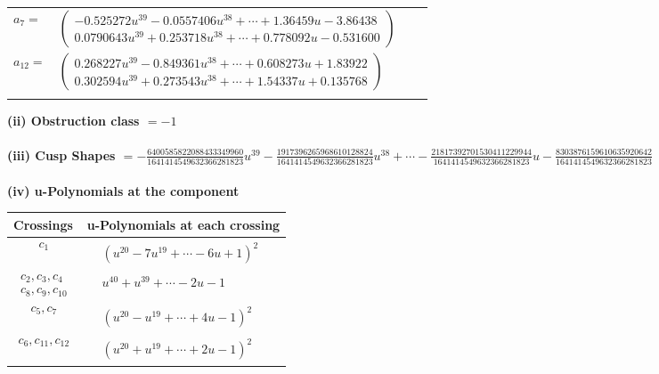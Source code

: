 \documentclass[1p]{elsarticle_modified}
\theoremstyle{definition}
\begin{document}
\begin{tabular}{m{7pt} m{180pt} m{7pt} m{180pt} }
\flushright $a_{7}=$&$\begin{pmatrix}-0.525272 u^{39}-0.0557406 u^{38}+\cdots+1.36459 u-3.86438\\0.0790643 u^{39}+0.253718 u^{38}+\cdots+0.778092 u-0.531600\end{pmatrix}$ \\
\flushright $a_{12}=$&$\begin{pmatrix}0.268227 u^{39}-0.849361 u^{38}+\cdots+0.608273 u+1.83922\\0.302594 u^{39}+0.273543 u^{38}+\cdots+1.54337 u+0.135768\end{pmatrix}$\\&\end{tabular}
\flushleft \textbf{(ii) Obstruction class $= -1$}\\~\\
\flushleft \textbf{(iii) Cusp Shapes $= -\frac{6400585822088433349960}{1641414549632366281823} u^{39}-\frac{1917396265968610128824}{1641414549632366281823} u^{38}+\cdots-\frac{21817392701530411229944}{1641414549632366281823} u-\frac{8303876159610635920642}{1641414549632366281823}$}\\~\\
\newpage\renewcommand{\arraystretch}{1}
\flushleft \textbf{(iv) u-Polynomials at the component}\newline \\
\begin{tabular}{m{50pt}|m{274pt}}
Crossings & \hspace{64pt}u-Polynomials at each crossing \\
\hline $$\begin{aligned}c_{1}\end{aligned}$$&$\begin{aligned}
&(u^{20}-7 u^{19}+\cdots-6 u+1)^{2}
\end{aligned}$\\
\hline $$\begin{aligned}c_{2},c_{3},c_{4}\\c_{8},c_{9},c_{10}\end{aligned}$$&$\begin{aligned}
&u^{40}+u^{39}+\cdots-2 u-1
\end{aligned}$\\
\hline $$\begin{aligned}c_{5},c_{7}\end{aligned}$$&$\begin{aligned}
&(u^{20}- u^{19}+\cdots+4 u-1)^{2}
\end{aligned}$\\
\hline $$\begin{aligned}c_{6},c_{11},c_{12}\end{aligned}$$&$\begin{aligned}
&(u^{20}+u^{19}+\cdots+2 u-1)^{2}
\end{aligned}$\\
\hline
\end{tabular}\\~\\
\end{document}
